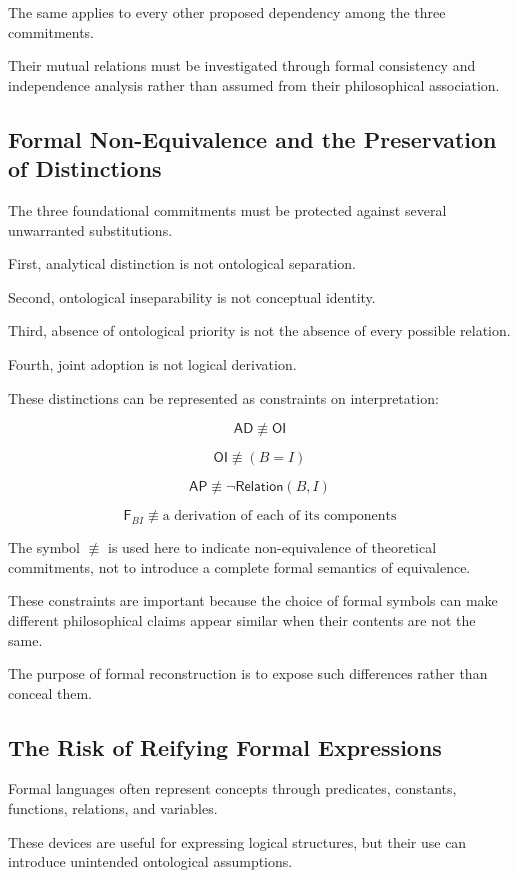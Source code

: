 The same applies to every other proposed
dependency among the three commitments.

Their mutual relations must be investigated
through formal consistency and independence
analysis rather than assumed from their
philosophical association.

\subsection{Formal Non-Equivalence and the Preservation of Distinctions}

The three foundational commitments
must be protected against several
unwarranted substitutions.

First, analytical distinction is not
ontological separation.

Second, ontological inseparability
is not conceptual identity.

Third, absence of ontological priority
is not the absence of every possible
relation.

Fourth, joint adoption is not logical
derivation.

These distinctions can be represented
as constraints on interpretation:

\[
\mathsf{AD}
\not\equiv
\mathsf{OI}
\]

\[
\mathsf{OI}
\not\equiv
(B=I)
\]

\[
\mathsf{AP}
\not\equiv
\neg\mathsf{Relation}(B,I)
\]

\[
\mathsf{F}_{BI}
\not\equiv
\text{a derivation of each of its components}
\]

The symbol \(\not\equiv\) is used here
to indicate non-equivalence of theoretical
commitments, not to introduce a complete
formal semantics of equivalence.

These constraints are important because
the choice of formal symbols can make
different philosophical claims appear
similar when their contents are not
the same.

The purpose of formal reconstruction
is to expose such differences rather
than conceal them.

\subsection{The Risk of Reifying Formal Expressions}

Formal languages often represent
concepts through predicates, constants,
functions, relations, and variables.

These devices are useful for expressing
logical structures, but their use
can introduce unintended ontological
assumptions.

